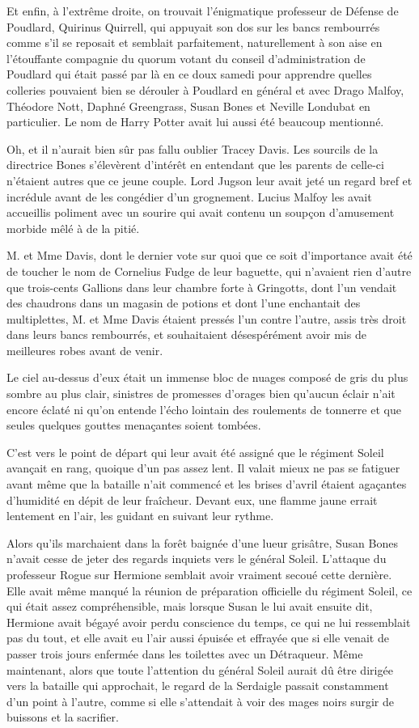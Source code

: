 Et enfin, à l'extrême droite, on trouvait l'énigmatique professeur de Défense de Poudlard, Quirinus Quirrell, qui appuyait son dos sur les bancs rembourrés comme s'il se reposait et semblait parfaitement, naturellement à son aise en l'étouffante compagnie du quorum votant du conseil d'administration de Poudlard qui était passé par là en ce doux samedi pour apprendre quelles colleries pouvaient bien se dérouler à Poudlard en général et avec Drago Malfoy, Théodore Nott, Daphné Greengrass, Susan Bones et Neville Londubat en particulier. Le nom de Harry Potter avait lui aussi été beaucoup mentionné.

Oh, et il n'aurait bien sûr pas fallu oublier Tracey Davis. Les sourcils de la directrice Bones s'élevèrent d'intérêt en entendant que les parents de celle-ci n'étaient autres que ce jeune couple. Lord Jugson leur avait jeté un regard bref et incrédule avant de les congédier d'un grognement. Lucius Malfoy les avait accueillis poliment avec un sourire qui avait contenu un soupçon d'amusement morbide mêlé à de la pitié.

M. et Mme Davis, dont le dernier vote sur quoi que ce soit d'importance avait été de toucher le nom de Cornelius Fudge de leur baguette, qui n'avaient rien d'autre que trois-cents Gallions dans leur chambre forte à Gringotts, dont l'un vendait des chaudrons dans un magasin de potions et dont l'une enchantait des multiplettes, M. et Mme Davis étaient pressés l'un contre l'autre, assis très droit dans leurs bancs rembourrés, et souhaitaient désespérément avoir mis de meilleures robes avant de venir.

Le ciel au-dessus d'eux était un immense bloc de nuages composé de gris du plus sombre au plus clair, sinistres de promesses d'orages bien qu'aucun éclair n'ait encore éclaté ni qu'on entende l'écho lointain des roulements de tonnerre et que seules quelques gouttes menaçantes soient tombées.

\later

C'est vers le point de départ qui leur avait été assigné que le régiment Soleil avançait en rang, quoique d'un pas assez lent. Il valait mieux ne pas se fatiguer avant même que la bataille n'ait commencé et les brises d'avril étaient agaçantes d'humidité en dépit de leur fraîcheur. Devant eux, une flamme jaune errait lentement en l'air, les guidant en suivant leur rythme.

Alors qu'ils marchaient dans la forêt baignée d'une lueur grisâtre, Susan Bones n'avait cesse de jeter des regards inquiets vers le général Soleil. L'attaque du professeur Rogue sur Hermione semblait avoir vraiment secoué cette dernière. Elle avait même manqué la réunion de préparation officielle du régiment Soleil, ce qui était assez compréhensible, mais lorsque Susan le lui avait ensuite dit, Hermione avait bégayé avoir perdu conscience du temps, ce qui ne lui ressemblait pas du tout, et elle avait eu l'air aussi épuisée et effrayée que si elle venait de passer trois jours enfermée dans les toilettes avec un Détraqueur. Même maintenant, alors que toute l'attention du général Soleil aurait dû être dirigée vers la bataille qui approchait, le regard de la Serdaigle passait constamment d'un point à l'autre, comme si elle s'attendait à voir des mages noirs surgir de buissons et la sacrifier.

